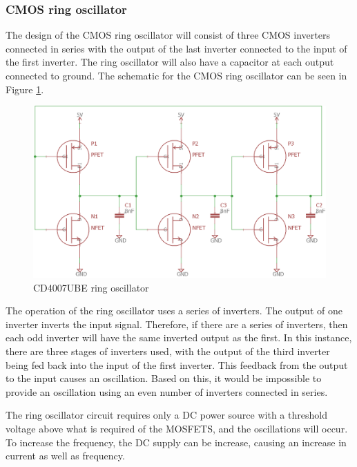\subsubsection{CMOS ring oscillator}

\noindent The design of the CMOS ring oscillator will consist of three CMOS inverters connected in series with the output of the last inverter connected to the input of the first inverter. The ring oscillator will also have a capacitor at each output connected to ground. The schematic for the CMOS ring oscillator can be seen in Figure \ref{fig:oscillator}.

\begin{figure}[H]
    \centering
        \centering
        \includegraphics[scale = .3]{CircuitDevelopment/cd4007SIM/RingOscillatorCMOS.png}
        \caption{CD4007UBE ring oscillator}
        \label{fig:oscillator}
\end{figure} 

The operation of the ring oscillator uses a series of inverters. The output of one inverter inverts the input signal. Therefore, if there are a series of inverters, then each odd inverter will have the same inverted output as the first. In this instance, there are three stages of inverters used, with the output of the third inverter being fed back into the input of the first inverter. This feedback from the output to the input causes an oscillation. Based on this, it would be impossible to provide an oscillation using an even number of inverters connected in series.\newline

The ring oscillator circuit requires only a DC power source with a threshold voltage above what is required of the MOSFETS, and the oscillations will occur. To increase the frequency, the DC supply can be increase, causing an increase in current as well as frequency. \newline

